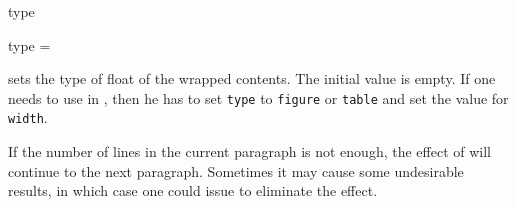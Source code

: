 \documentclass{l3doc}
\newcommand{\opt}[1]{\texttt{#1}}
\begin{document}
\begin{function}{type}
  \begin{syntax}
    type = 
  \end{syntax}
  sets the type of float of the wrapped contents.
  The initial value is empty.
  If one needs to use  in ,
  then he has to set \opt{type} to \opt{figure} or \opt{table}
  and set the value for \opt{width}.
\end{function}

\begin{function}{\wrapstuffclear}
  If the number of lines in the current paragraph is not enough,
  the effect of  will continue to the next paragraph.
  Sometimes it may cause some undesirable results,
  in which case one could issue  to eliminate
  the effect.
\end{function}

\PrintIndex
\end{document}
